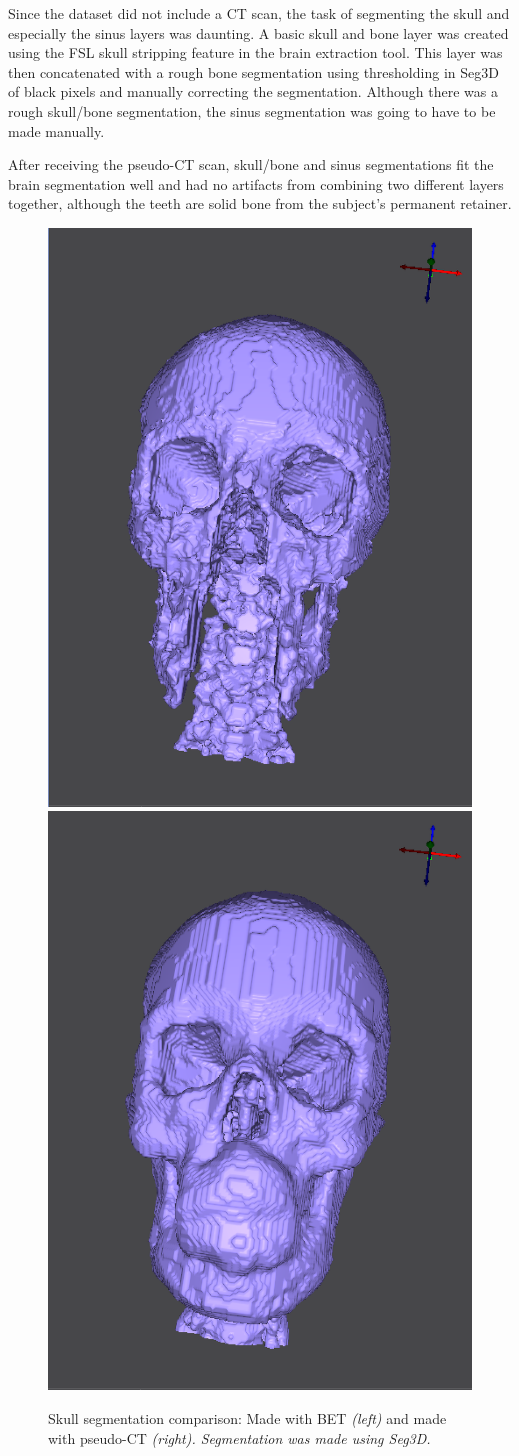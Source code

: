 Since the dataset did not include a CT scan, the task of segmenting the skull and especially the sinus layers was daunting. A basic skull and bone layer was created using the FSL skull stripping feature  \cite{ref:bet2} in the brain extraction tool. This layer was then concatenated with a rough bone segmentation using thresholding in Seg3D of black pixels and manually correcting the segmentation. Although there was a rough skull/bone segmentation, the sinus segmentation was going to have to be made manually.

After receiving the pseudo-CT scan, skull/bone and sinus segmentations fit the brain segmentation well and had no artifacts from combining two different layers together, although the teeth are solid bone from the subject's permanent retainer.

\begin{figure}[H]
\begin{center}
\includegraphics[width=.49\textwidth]{Figures/skull_before}
\includegraphics[width=.49\textwidth]{Figures/skull_after}
\caption{Skull segmentation comparison: Made with BET \textit{(left)} and made with pseudo-CT \textit{(right). Segmentation was made using Seg3D.}}
\label{fig:skull}
\end{center}
\end{figure}


